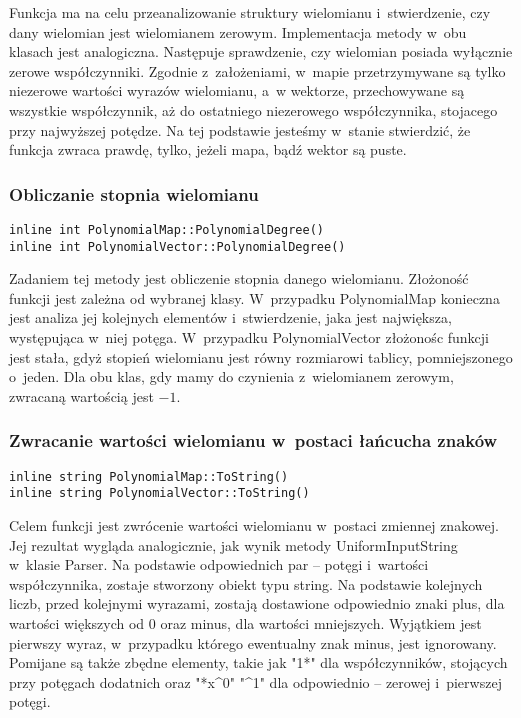 Funkcja ma na celu przeanalizowanie struktury wielomianu i~stwierdzenie, czy dany wielomian jest wielomianem zerowym. Implementacja metody w~obu klasach jest analogiczna. Następuje sprawdzenie, czy wielomian posiada wyłącznie zerowe współczynniki. Zgodnie z~założeniami, w~mapie przetrzymywane są tylko niezerowe wartości wyrazów wielomianu, a~w wektorze, przechowywane są wszystkie współczynnik, aż do ostatniego niezerowego współczynnika, stojacego przy najwyższej potędze. Na tej podstawie jesteśmy w~stanie stwierdzić, że funkcja zwraca prawdę, tylko, jeżeli mapa, bądź wektor są puste.

\subsubsection{Obliczanie stopnia wielomianu}
\begin{lstlisting}
inline int PolynomialMap::PolynomialDegree()
inline int PolynomialVector::PolynomialDegree()
\end{lstlisting}

Zadaniem tej metody jest obliczenie stopnia danego wielomianu. Złożoność funkcji jest zależna od wybranej klasy. W~przypadku PolynomialMap konieczna jest analiza jej kolejnych elementów i~stwierdzenie, jaka jest największa, występująca w~niej potęga. W~przypadku PolynomialVector złożonośc funkcji jest stała, gdyż stopień wielomianu jest równy rozmiarowi tablicy, pomniejszonego o~jeden. Dla obu klas, gdy mamy do czynienia z~wielomianem zerowym, zwracaną wartością jest $-1$.

\subsubsection{Zwracanie wartości wielomianu w~postaci łańcucha znaków}
\begin{lstlisting}
inline string PolynomialMap::ToString()
inline string PolynomialVector::ToString()
\end{lstlisting}

Celem funkcji jest zwrócenie wartości wielomianu w~postaci zmiennej znakowej. Jej rezultat wygląda analogicznie, jak wynik metody UniformInputString w~klasie Parser. Na podstawie odpowiednich par – potęgi i~wartości współczynnika, zostaje stworzony obiekt typu string. Na podstawie kolejnych liczb, przed kolejnymi wyrazami, zostają dostawione odpowiednio znaki plus, dla wartości większych od $0$ oraz minus, dla wartości mniejszych. Wyjątkiem jest pierwszy wyraz, w~przypadku którego ewentualny znak minus, jest ignorowany. Pomijane są także zbędne elementy, takie jak "1*" dla współczynników, stojących przy potęgach dodatnich oraz "*x\^{}0" "\^{}1" dla odpowiednio – zerowej i~pierwszej potęgi.

